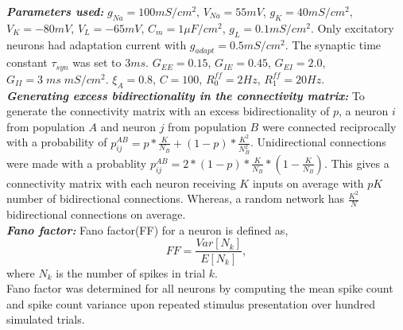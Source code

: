 \textbf{\textit{Parameters used:}} 
$g_{Na}=100mS / cm^2$, $V_{Na} = 55mV$, 
$g_{K} = 40mS / cm^2$, $V_{K} = -80mV$,
$V_L = -65mV$, 
$C_m = 1 \mu F / cm^2$, 
$g_L = 0.1 mS / cm^2$. 
Only excitatory neurons had adaptation current with $g_{adapt} = 0.5 mS/cm^2$. The synaptic time constant $\tau_{syn}$ was set to $3ms$. $G_{EE} = 0.15$, $G_{IE} = 0.45$, $G_{EI} = 2.0$, $G_{II} = 3 \; ms \; mS / cm^2$. 
$\xi_A = 0.8$, $C = 100$, $R_0^{ff} = 2Hz$, $R_1^{ff} = 20Hz$. \\

\textbf{\textit{Generating excess bidirectionality in the connectivity matrix:}}
To generate the connectivity matrix with an excess bidirectionality of $p$, a neuron $i$ from population $A$ and neuron $j$ from population $B$  were connected reciprocally with a  probability of $p_{ij}^{AB} = p * \frac{K}{N_{B}} + (1 - p) * \frac{K^2}{N_{B}^2}$. 
Unidirectional connections were  made with a probablity $p_{ij}^{AB}  = 2 * (1 - p) * \frac{K}{N_{B}} * (1 -  \frac{K}{N_{B}})$. This gives a connectivity matrix with each neuron receiving $K$ inputs on average with $pK$ number of bidirectional connections. Whereas, a random network has $\frac{K^2}{N}$ bidirectional connections on average. \\

\textbf{\textit{Fano factor:}}
Fano factor(FF) for a neuron is defined as,\\
\begin{equation}
FF = \frac{Var[N_{k}]}{E[N_{k}]},
\end{equation}
where $N_{k}$ is the number of spikes in trial $k$. \\
Fano factor was determined for all neurons by computing the mean spike count and spike count variance upon repeated stimulus presentation over hundred simulated trials. \\

